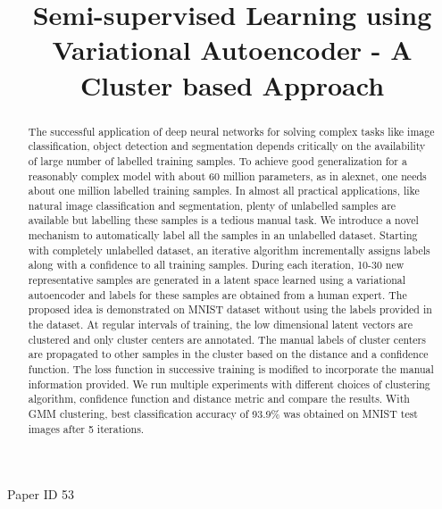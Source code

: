 \documentclass[runningheads]{llncs}
\begin{document}
%
\title{Semi-supervised Learning using Variational Autoencoder - A Cluster based Approach}
%
%
%
\maketitle              %
%
Paper ID 53

\begin{abstract}
    The successful application of deep neural networks for solving complex tasks like image classification, object detection and segmentation depends critically on the availability of large number of labelled training samples.
To achieve good generalization for a reasonably complex model with about 60 million parameters, as in alexnet, one needs about one million labelled training samples.
In almost all practical applications, like natural image classification and segmentation,  plenty of unlabelled samples are available but labelling these samples is a tedious manual task.
We introduce a novel mechanism to automatically label all the samples in an unlabelled dataset.
    Starting with completely unlabelled dataset, an iterative algorithm incrementally assigns labels along with a confidence to all training samples.
    During each iteration, 10-30 new representative samples are generated in a latent space learned using a variational autoencoder and labels for these samples are obtained from a human expert.
The proposed  idea  is demonstrated on MNIST dataset without using the labels provided in the dataset.
At regular intervals of training, the low dimensional latent vectors are clustered and only cluster centers are annotated.
    The manual labels of cluster centers are propagated to other samples in the cluster based on the distance and a confidence function.
The loss function in successive training is modified to incorporate the manual information provided.
    We run multiple experiments with different choices of clustering algorithm, confidence function and distance metric and compare the results.
With GMM clustering, best classification accuracy of 93.9\% was obtained on MNIST test images after 5 iterations.

\end{abstract}
%
%
%
\end{document}
